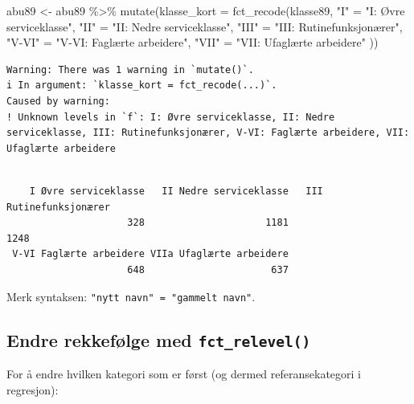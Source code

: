 \documentclass[
  norsk,
  letterpaper,
  DIV=11,
  numbers=noendperiod]{scrreprt}
\newenvironment{Shaded}{\begin{snugshade}}{\end{snugshade}}
\newcommand{\AttributeTok}[1]{\textcolor[rgb]{0.40,0.45,0.13}{#1}}
\newcommand{\FunctionTok}[1]{\textcolor[rgb]{0.28,0.35,0.67}{#1}}
\newcommand{\NormalTok}[1]{\textcolor[rgb]{0.00,0.23,0.31}{#1}}
\newcommand{\OtherTok}[1]{\textcolor[rgb]{0.00,0.23,0.31}{#1}}
\newcommand{\SpecialCharTok}[1]{\textcolor[rgb]{0.37,0.37,0.37}{#1}}
\newcommand{\StringTok}[1]{\textcolor[rgb]{0.13,0.47,0.30}{#1}}
\theoremstyle{definition}
\theoremstyle{remark}
\begin{document}
\begin{Shaded}
\begin{Highlighting}[]
\NormalTok{abu89 }\OtherTok{\textless{}{-}}\NormalTok{ abu89 }\SpecialCharTok{\%\textgreater{}\%}
  \FunctionTok{mutate}\NormalTok{(}\AttributeTok{klasse\_kort =} \FunctionTok{fct\_recode}\NormalTok{(klasse89,}
    \StringTok{"I"} \OtherTok{=} \StringTok{"I: Øvre serviceklasse"}\NormalTok{,}
    \StringTok{"II"} \OtherTok{=} \StringTok{"II: Nedre serviceklasse"}\NormalTok{,}
    \StringTok{"III"} \OtherTok{=} \StringTok{"III: Rutinefunksjonærer"}\NormalTok{,}
    \StringTok{"V{-}VI"} \OtherTok{=} \StringTok{"V{-}VI: Faglærte arbeidere"}\NormalTok{,}
    \StringTok{"VII"} \OtherTok{=} \StringTok{"VII: Ufaglærte arbeidere"}
\NormalTok{  ))}
\end{Highlighting}
\end{Shaded}

\begin{verbatim}
Warning: There was 1 warning in `mutate()`.
i In argument: `klasse_kort = fct_recode(...)`.
Caused by warning:
! Unknown levels in `f`: I: Øvre serviceklasse, II: Nedre serviceklasse, III: Rutinefunksjonærer, V-VI: Faglærte arbeidere, VII: Ufaglærte arbeidere
\end{verbatim}

\begin{Shaded}
\end{Shaded}

\begin{verbatim}

    I Øvre serviceklasse   II Nedre serviceklasse   III Rutinefunksjonærer 
                     328                     1181                     1248 
 V-VI Faglærte arbeidere VIIa Ufaglærte arbeidere 
                     648                      637 
\end{verbatim}

Merk syntaksen: \texttt{"nytt\ navn"\ =\ "gammelt\ navn"}.

\subsection{\texorpdfstring{Endre rekkefølge med
\texttt{fct\_relevel()}}{Endre rekkefølge med fct\_relevel()}}\label{endre-rekkefuxf8lge-med-fct_relevel}

For å endre hvilken kategori som er først (og dermed referansekategori i
regresjon):
\end{document}
